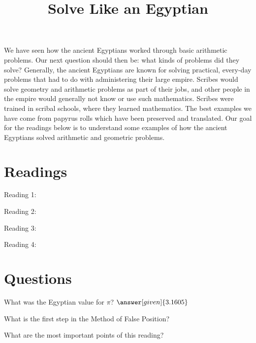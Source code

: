 \documentclass{ximera}
\title{Solve Like an Egyptian}
\begin{document}
\begin{abstract}
\end{abstract}
\maketitle


We have seen how the ancient Egyptians worked through basic arithmetic problems.  Our next question should then be: what kinds of problems did they solve?  Generally, the ancient Egyptians are known for solving practical, every-day problems that had to do with administering their large empire.  Scribes would solve geometry and arithmetic problems as part of their jobs, and other people in the empire would generally not know or use such mathematics.  Scribes were trained in scribal schools, where they learned mathematics.  The best examples we have come from papyrus rolls which have been preserved and translated.  Our goal for the readings below is to understand some examples of how the ancient Egyptians solved arithmetic and geometric problems.



\section{Readings}

Reading 1: 

Reading 2: 

Reading 3: 

Reading 4: 


\section{Questions}

\begin{question}
What was the Egyptian value for $\pi$? $\answer[given]{3.1605}$
\end{question}

\begin{question}
What is the first step in the Method of False Position?
\begin{multipleChoice}
\end{multipleChoice}
\end{question}


\begin{question}
What are the most important points of this reading?
\begin{freeResponse}
\end{freeResponse}
\end{question}
\end{document}
